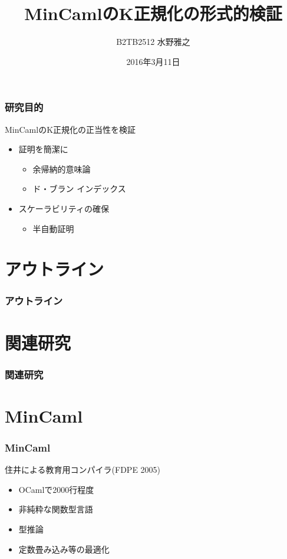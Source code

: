 \documentclass[dvipdfmx,cjk,xcolor=dvipsnames,envcountsect,notheorems,12pt]{beamer}
\title{MinCamlのK正規化の形式的検証}
\author{B2TB2512 水野雅之}
\institute[東北大学　住井・松田研]{工学部　情報知能システム総合学科\\住井・松田研究室}%
\date{2016年3月11日}
\theoremstyle{definition}
\begin{document}
\frame[plain]{\titlepage}%

\begin{frame}
	\frametitle{研究目的}
	\LARGE MinCamlのK正規化の正当性を検証
	\begin{itemize}
		\item 証明を簡潔に
			\begin{itemize}
				\item 余帰納的意味論
				\item ド・ブラン インデックス
			\end{itemize}
		\item スケーラビリティの確保
			\begin{itemize}
				\item 半自動証明
			\end{itemize}
	\end{itemize}
\end{frame}

\section*{アウトライン}

\begin{frame}
  \frametitle{アウトライン}
  \tableofcontents[sectionstyle=show,subsectionstyle=hide]
\end{frame}

\section{関連研究}

\begin{frame}
	\frametitle{関連研究}
\end{frame}

\section{MinCaml}

\begin{frame}
	\frametitle{MinCaml}
	\Large 住井による教育用コンパイラ(FDPE 2005)
	\begin{itemize}
		\item OCamlで2000行程度
		\item 非純粋な関数型言語
		\item 型推論
		\item 定数畳み込み等の最適化
	\end{itemize}
\end{frame}
\end{document}
